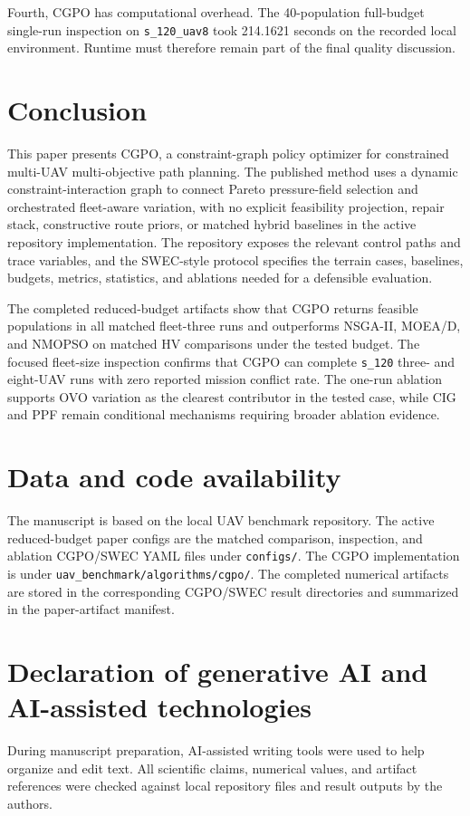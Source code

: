 \documentclass[a4paper,fleqn]{cas-dc}
\begin{document}
Fourth, CGPO has computational overhead. The 40-population full-budget single-run inspection on \texttt{s\_120\_uav8} took 214.1621 seconds on the recorded local environment. Runtime must therefore remain part of the final quality discussion.

\section{Conclusion}
\label{sec:conclusion}

This paper presents CGPO, a constraint-graph policy optimizer for constrained multi-UAV multi-objective path planning. The published method uses a dynamic constraint-interaction graph to connect Pareto pressure-field selection and orchestrated fleet-aware variation, with no explicit feasibility projection, repair stack, constructive route priors, or matched hybrid baselines in the active repository implementation. The repository exposes the relevant control paths and trace variables, and the SWEC-style protocol specifies the terrain cases, baselines, budgets, metrics, statistics, and ablations needed for a defensible evaluation.

The completed reduced-budget artifacts show that CGPO returns feasible populations in all matched fleet-three runs and outperforms NSGA-II, MOEA/D, and NMOPSO on matched HV comparisons under the tested budget. The focused fleet-size inspection confirms that CGPO can complete \texttt{s\_120} three- and eight-UAV runs with zero reported mission conflict rate. The one-run ablation supports OVO variation as the clearest contributor in the tested case, while CIG and PPF remain conditional mechanisms requiring broader ablation evidence.

\section*{Data and code availability}

The manuscript is based on the local UAV benchmark repository. The active reduced-budget paper configs are the matched comparison, inspection, and ablation CGPO/SWEC YAML files under \texttt{configs/}. The CGPO implementation is under \texttt{uav\_benchmark/algorithms/cgpo/}. The completed numerical artifacts are stored in the corresponding CGPO/SWEC result directories and summarized in the paper-artifact manifest.

\section*{Declaration of generative AI and AI-assisted technologies}

During manuscript preparation, AI-assisted writing tools were used to help organize and edit text. All scientific claims, numerical values, and artifact references were checked against local repository files and result outputs by the authors.



\end{document}
